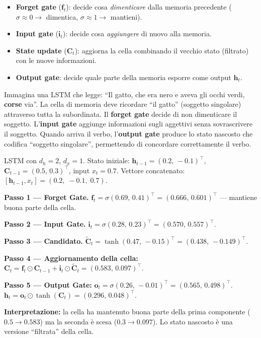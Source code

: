 \documentclass[
  11pt,
]{article}
\begin{document}
\begin{notabox}[title={\textbf{In parole semplici}}]
\begin{itemize}
\item \textbf{Forget gate} ($\mathbf{f}_t$): decide cosa \emph{dimenticare} dalla memoria precedente ($\sigma \approx 0 \to$ dimentica, $\sigma \approx 1 \to$ mantieni).
\item \textbf{Input gate} ($\mathbf{i}_t$): decide cosa \emph{aggiungere} di nuovo alla memoria.
\item \textbf{State update} ($\mathbf{C}_t$): aggiorna la cella combinando il vecchio stato (filtrato) con le nuove informazioni.
\item \textbf{Output gate}: decide quale parte della memoria esporre come output $\mathbf{h}_t$.
\end{itemize}
\end{notabox}

\begin{notabox}[title={\textbf{In parole semplici: LSTM che legge un testo}}]
Immagina una LSTM che legge: ``Il gatto, che era nero e aveva gli occhi verdi, \textbf{corse} via''. La cella di memoria deve ricordare ``il gatto'' (soggetto singolare) attraverso tutta la subordinata. Il \textbf{forget gate} decide di non dimenticare il soggetto. L'\textbf{input gate} aggiunge informazioni sugli aggettivi senza sovrascrivere il soggetto. Quando arriva il verbo, l'\textbf{output gate} produce lo stato nascosto che codifica ``soggetto singolare'', permettendo di concordare correttamente il verbo.
\end{notabox}

\begin{notabox}[title={\textbf{Esempio numerico: forward pass LSTM gate per gate}}]
LSTM con $d_h = 2$, $d_x = 1$. Stato iniziale: $\mathbf{h}_{t-1} = (0.2,\, -0.1)^\top$, $\mathbf{C}_{t-1} = (0.5,\, 0.3)^\top$, input $x_t = 0.7$. Vettore concatenato: $[\mathbf{h}_{t-1}, x_t] = (0.2,\; -0.1,\; 0.7)$.

\textbf{Passo 1 --- Forget Gate.} $\mathbf{f}_t = \sigma(0.69,\, 0.41)^\top = (0.666,\, 0.601)^\top$ --- mantiene buona parte della cella.

\textbf{Passo 2 --- Input Gate.} $\mathbf{i}_t = \sigma(0.28,\, 0.23)^\top = (0.570,\, 0.557)^\top$.

\textbf{Passo 3 --- Candidato.} $\tilde{\mathbf{C}}_t = \tanh(0.47,\, -0.15)^\top = (0.438,\, -0.149)^\top$.

\textbf{Passo 4 --- Aggiornamento della cella:}
$\mathbf{C}_t = \mathbf{f}_t \odot \mathbf{C}_{t-1} + \mathbf{i}_t \odot \tilde{\mathbf{C}}_t = (0.583,\, 0.097)^\top$.

\textbf{Passo 5 --- Output Gate:} $\mathbf{o}_t = \sigma(0.26,\, -0.01)^\top = (0.565,\, 0.498)^\top$. $\mathbf{h}_t = \mathbf{o}_t \odot \tanh(\mathbf{C}_t) = (0.296,\, 0.048)^\top$.

\textbf{Interpretazione:} la cella ha mantenuto buona parte della prima componente ($0.5 \to 0.583$) ma la seconda è scesa ($0.3 \to 0.097$). Lo stato nascosto è una versione ``filtrata'' della cella.
\end{notabox}
\end{document}
